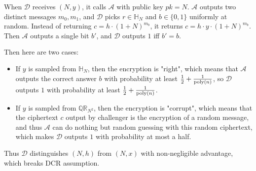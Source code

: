 \documentclass[8pt]{article}
\theoremstyle{compact}
\begin{document}
When $\mathcal D$ receives $(N, y)$, it calls $\mathcal A$ with public key $pk = N$. $\mathcal A$ outputs two distinct messages $m_0, m_1$, and $\mathcal D$ picks $r \in \mathbb H_N$ and $b \in \{0, 1\}$ uniformly at random. Instead of returning $c = h \cdot (1 + N)^{m_b}$, it returns $c = h \cdot y \cdot (1 + N)^{m_b}$. Then $\mathcal A$ outputs a single bit $b'$, and $\mathcal D$ outputs $1$ iff $b' = b$.

Then here are two cases: \begin{itemize}
	\item If $y$ is sampled from $\mathbb H_N$, then the encryption is "right", which means that $\mathcal A$ outputs the correct answer $b$ with probability at least $\frac12 + \frac{1}{\text{poly}(n)}$, so $\mathcal D$ outputs $1$ with probability at least $\frac12 + \frac{1}{\text{poly}(n)}$.
	\item If $y$ is sampled from $\mathbb{QR}_{N^2}$, then the encryption is "corrupt", which means that the ciphertext $c$ output by challenger is the encryption of a random message, and thus $\mathcal A$ can do nothing but random guessing with this random ciphertext, which makes $\mathcal D$ outputs $1$ with probability at most a half.
\end{itemize}

Thus $\mathcal D$ distinguishes $(N, h)$ from $(N, x)$ with non-negligible advantage, which breaks DCR assumption.
\end{document}
